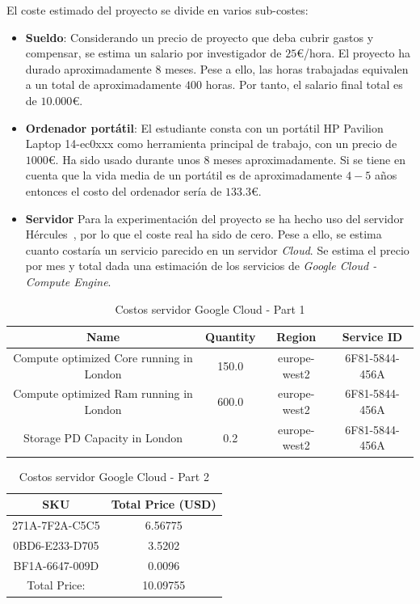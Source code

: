El coste estimado del proyecto se divide en varios sub-costes:
\begin{itemize}
      \item \textbf{Sueldo}: Considerando un precio de proyecto que deba cubrir gastos y compensar, se estima un salario por investigador de $25$€/hora. El proyecto ha durado aproximadamente $8$ meses. Pese a ello, las horas trabajadas equivalen a un total de aproximadamente $400$ horas. Por tanto, el salario final total es de $10.000$€.
      \item \textbf{Ordenador portátil}: El estudiante consta con un portátil HP Pavilion Laptop 14-ec0xxx como herramienta principal de trabajo, con un precio de $1000$€. Ha sido usado durante unos $8$ meses aproximadamente. Si se tiene en cuenta que la vida media de un portátil es de aproximadamente $4-5$ años~\cite{woidasky_use_2021} entonces el costo del ordenador sería de $133.3$€.
      \item \textbf{Servidor} Para la experimentación del proyecto se ha hecho uso del servidor Hércules~\cite{citicugr}, por lo que el coste real ha sido de cero. Pese a ello, se estima cuanto costaría un servicio parecido en un servidor \textit{Cloud}. Se estima el precio por mes y total dada una estimación de los servicios de \textit{Google Cloud - Compute Engine}.
\end{itemize}
\begin{table}[H]
      \centering
      \begin{tabular}{|c|c|c|c|}
            \hline
            \textbf{Name}                            & \textbf{Quantity} & \textbf{Region} & \textbf{Service ID} \\
            \hline
            Compute optimized Core running in London & 150.0             & europe-west2    & 6F81-5844-456A      \\
            Compute optimized Ram running in London  & 600.0             & europe-west2    & 6F81-5844-456A      \\
            Storage PD Capacity in London            & 0.2               & europe-west2    & 6F81-5844-456A      \\
            \hline
      \end{tabular}
      \caption{Costos servidor Google Cloud - Part 1}
      \label{tab:server_costs_part1}
\end{table}
\begin{table}[H]
      \centering
      \begin{tabular}{|c|c|}
            \hline
            \textbf{SKU}   & \textbf{Total Price (USD)} \\
            \hline
            271A-7F2A-C5C5 & 6.56775                    \\
            0BD6-E233-D705 & 3.5202                     \\
            BF1A-6647-009D & 0.0096                     \\
            \hline
            Total Price:   & 10.09755                   \\
            \hline
      \end{tabular}
      \caption{Costos servidor Google Cloud - Part 2}
      \label{tab:server_costs_part2}
\end{table}
